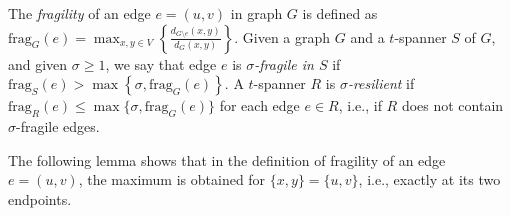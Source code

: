 \documentclass{article}
\newcommand{\dist}          {d}
\newcommand{\frag}          {\mathrm{frag}}
\newcommand{\nota}[1]{\textbf{(*)}\marginpar {\tiny \raggedright{(*) #1}}}
\newcommand{\commento}[1] {}
\newcommand{\braces}[1]       {\left\{ #1 \right\}}
\begin{document}
\commento{
\nota{PGF: queste definizioni servono solo a definire poi l'insieme di short cycles $\Gamma_e$. Potremmo definire direttamente qui $\Gamma_e$}
Similarly, we denote by 
${\cal P}_{e}(x,y)$ the set of all paths between $x$ and $y$ containing edge $e$, and by 
${\cal P}_{\overline{e}}(x,y)$ the set of all paths between $x$ and $y$ avoiding edge $e$.
We further denote by $\Pi_{e}(x,y)$ (respectively $\Pi_{\overline{e}}(x,y)$)
the set of shortest paths in ${\cal P}_{e}(x,y)$ (respectively ${\cal P}_{\overline{e}}(x,y)$).
}
The \emph{fragility} of an edge $e=(u,v)$ in graph $G$ is defined as
$\frag_G(e) = \max_{x,y \in V} \left\{\frac{\dist_{G\setminus e}(x,y)}{\dist_{G}(x,y)}\right\}$. 
Given a graph $G$ and a $t$-spanner $S$ of $G$, and given $\sigma \geq 1$, we say that edge $e$ is \emph{$\sigma$-fragile in $S$} if $\frag_S(e) > \max\braces{\sigma, \frag_G(e)}$. A $t$-spanner $R$ is \emph{$\sigma$-resilient} if $\frag_R(e) \leq \max\{\sigma, \frag_G(e)\}$ for each edge $e \in R$, i.e., if $R$ does not contain $\sigma$-fragile edges. 


The following lemma shows that in the definition of fragility of an edge $e=(u,v)$, the maximum is obtained for $\{x,y\}=\{u,v\}$, i.e., exactly at its two endpoints.
\end{document}
